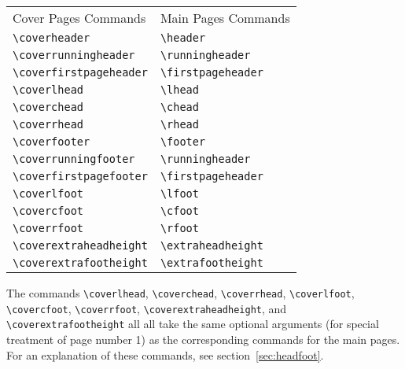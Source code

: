 \documentclass[12pt]{exam}
\begin{document}
\begin{center}
  \begin{tabular}{l@{\qquad\qquad}l}
\multicolumn{1}{l}{Cover Pages Commands}& Main Pages Commands\\[\medskipamount]
\verb"\coverheader"&\verb"\header"\\
\verb"\coverrunningheader"&\verb"\runningheader"\\
\verb"\coverfirstpageheader"&\verb"\firstpageheader"\\[\medskipamount]

\verb"\coverlhead"&\verb"\lhead"\\
\verb"\coverchead"&\verb"\chead"\\
\verb"\coverrhead"&\verb"\rhead"\\[\medskipamount]

\verb"\coverfooter"&\verb"\footer"\\
\verb"\coverrunningfooter"&\verb"\runningheader"\\
\verb"\coverfirstpagefooter"&\verb"\firstpageheader"\\[\medskipamount]

\verb"\coverlfoot"&\verb"\lfoot"\\
\verb"\covercfoot"&\verb"\cfoot"\\
\verb"\coverrfoot"&\verb"\rfoot"\\[\medskipamount]

\verb"\coverextraheadheight"&\verb"\extraheadheight"\\
\verb"\coverextrafootheight"&\verb"\extrafootheight"
  \end{tabular}
\end{center}
The commands \verb"\coverlhead", \verb"\coverchead",
\verb"\coverrhead", \verb"\coverlfoot", \verb"\covercfoot",
\verb"\coverrfoot", \verb"\coverextraheadheight", and
\verb"\coverextrafootheight" all all take the same optional arguments
(for special treatment of page number 1) as the corresponding commands
for the main pages.  For an explanation of these commands, see
section~\ref{sec:headfoot}.




\makeatletter
\@pointschangedfalse
\makeatother
\end{document}
